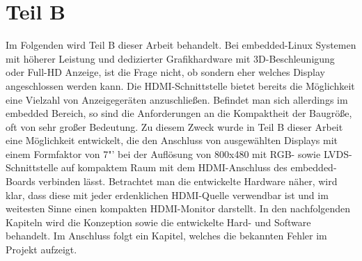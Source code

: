 \chapter{Teil B}
\label{cha:TeilB}
Im Folgenden wird Teil B dieser Arbeit behandelt. Bei embedded-Linux Systemen mit höherer Leistung und dedizierter Grafikhardware mit 3D-Beschleunigung oder Full-HD Anzeige, ist die Frage nicht, ob sondern eher welches Display angeschlossen werden kann. Die HDMI-Schnittstelle bietet bereits die Möglichkeit eine Vielzahl von Anzeigegeräten anzuschließen. Befindet man sich allerdings im embedded Bereich, so sind die Anforderungen an die Kompaktheit der Baugröße, oft von sehr großer Bedeutung. Zu diesem Zweck wurde in Teil B dieser Arbeit eine Möglichkeit entwickelt, die den Anschluss von ausgewählten Displays mit einem Formfaktor von 7"' bei der Auflösung von 800x480 mit RGB- sowie LVDS-Schnittstelle auf kompaktem Raum mit dem HDMI-Anschluss des embedded-Boards  verbinden lässt. Betrachtet man die entwickelte Hardware näher, wird klar, dass diese mit jeder erdenklichen HDMI-Quelle verwendbar ist und im weitesten Sinne einen kompakten HDMI-Monitor darstellt.
In den nachfolgenden Kapiteln wird die Konzeption sowie die entwickelte Hard- und Software behandelt. Im Anschluss folgt ein Kapitel, welches die bekannten Fehler im Projekt aufzeigt.\newpage




